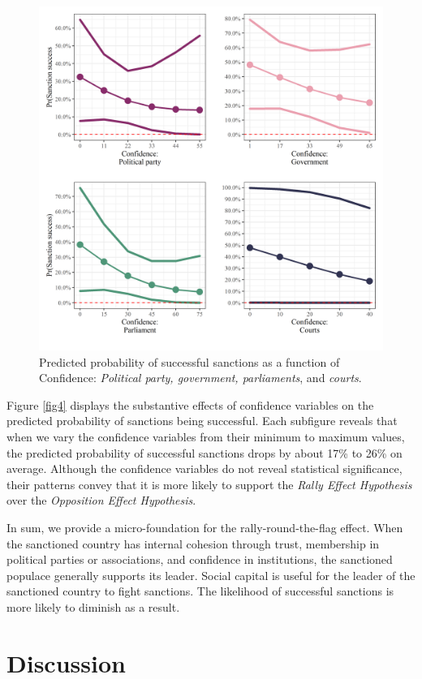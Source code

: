 \documentclass[12pt,]{article}
\begin{document}
\begin{figure}[ht]

{\centering \includegraphics[width=0.65\linewidth]{figures/figure4} 

}

\caption{\label{fig4} Predicted probability of successful sanctions as a function of Confidence: \textit{Political party, government, parliaments}, and \textit{courts}.}\label{fig:unnamed-chunk-6}
\end{figure}

Figure \ref{fig4} displays the substantive effects of confidence
variables on the predicted probability of sanctions being successful.
Each subfigure reveals that when we vary the confidence variables from
their minimum to maximum values, the predicted probability of successful
sanctions drops by about 17\% to 26\% on average. Although the
confidence variables do not reveal statistical significance, their
patterns convey that it is more likely to support the \emph{Rally Effect
Hypothesis} over the \emph{Opposition Effect Hypothesis}.

In sum, we provide a micro-foundation for the rally-round-the-flag
effect. When the sanctioned country has internal cohesion through trust,
membership in political parties or associations, and confidence in
institutions, the sanctioned populace generally supports its leader.
Social capital is useful for the leader of the sanctioned country to
fight sanctions. The likelihood of successful sanctions is more likely
to diminish as a result.

\hypertarget{discussion}{%
\section{Discussion}\label{discussion}}
\end{document}
